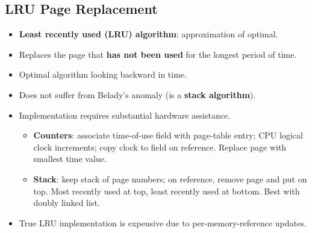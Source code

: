 \subsection{LRU Page Replacement}
\begin{itemize}
    \item \textbf{Least recently used (LRU) algorithm}: approximation of optimal.
    \item Replaces the page that \textbf{has not been used} for the longest period of time.
    \item Optimal algorithm looking backward in time.
    \item Does not suffer from Belady's anomaly (is a \textbf{stack algorithm}).
    \item Implementation requires substantial hardware assistance.
    \begin{itemize}
        \item \textbf{Counters}: associate time-of-use field with page-table entry; CPU logical clock increments; copy clock to field on reference. Replace page with smallest time value.
        \item \textbf{Stack}: keep stack of page numbers; on reference, remove page and put on top. Most recently used at top, least recently used at bottom. Best with doubly linked list.
    \end{itemize}
    \item True LRU implementation is expensive due to per-memory-reference updates.
\end{itemize}

